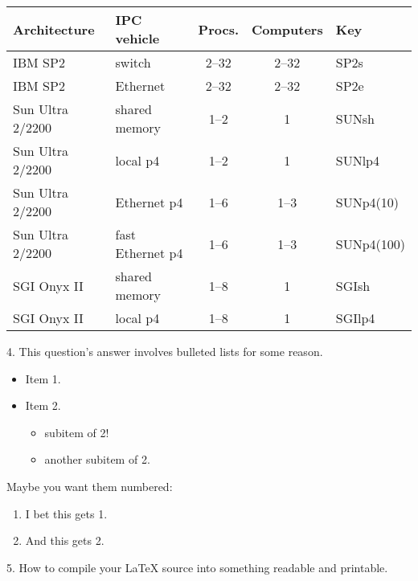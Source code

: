 \documentclass[12pt]{article}
\begin{document}
\begin{center}
\begin{tabular}{|l|l|c|c|l|}
\hline
{\bf Architecture} & {\bf IPC vehicle} & {\bf Procs.} & {\bf
Computers} & {\bf Key}
\\ \hline \hline
IBM SP2 & switch & 2--32 & 2--32 & SP2s \\ \hline
IBM SP2 & Ethernet & 2--32 & 2--32 & SP2e \\ \hline
Sun Ultra 2/2200 & shared memory & 1--2 & 1 & SUNsh \\ \hline
Sun Ultra 2/2200 & local p4 & 1--2 & 1 & SUNlp4 \\ \hline
Sun Ultra 2/2200 & Ethernet p4 & 1--6 & 1--3 & SUNp4(10) \\ \hline
Sun Ultra 2/2200 & fast Ethernet p4 & 1--6 & 1--3 & SUNp4(100) \\ \hline
SGI Onyx II & shared memory & 1--8 & 1 & SGIsh \\ \hline
SGI Onyx II & local p4 & 1--8 & 1 & SGIlp4 \\ \hline
\end{tabular}
\end{center}

\bigskip

4.  This question's answer involves bulleted lists for some reason.

\begin{itemize}

\item Item 1.

\item Item 2.

  \begin{itemize}
   \item subitem of 2!
   \item another subitem of 2.
  \end{itemize}

\end{itemize}

Maybe you want them numbered:

\begin{enumerate}

\item I bet this gets 1.

\item And this gets 2.

\end{enumerate}

\bigskip

5. How to compile your \LaTeX{} source into something readable and printable.
\end{document}
